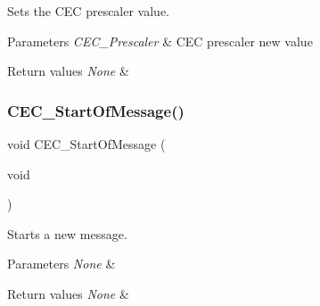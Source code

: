 Sets the C\+EC prescaler value. 


\begin{DoxyParams}{Parameters}
{\em C\+E\+C\+\_\+\+Prescaler} & C\+EC prescaler new value \\
\hline
\end{DoxyParams}

\begin{DoxyRetVals}{Return values}
{\em None} & \\
\hline
\end{DoxyRetVals}
\mbox{\label{group___c_e_c___exported___functions_ga71e700461ffe7820d9e1c75da65fd0fb}} 
\subsubsection{\texorpdfstring{CEC\_StartOfMessage()}{CEC\_StartOfMessage()}}
{\footnotesize\ttfamily void C\+E\+C\+\_\+\+Start\+Of\+Message (\begin{DoxyParamCaption}\item[{void}]{ }\end{DoxyParamCaption})}



Starts a new message. 


\begin{DoxyParams}{Parameters}
{\em None} & \\
\hline
\end{DoxyParams}

\begin{DoxyRetVals}{Return values}
{\em None} & \\
\hline
\end{DoxyRetVals}
